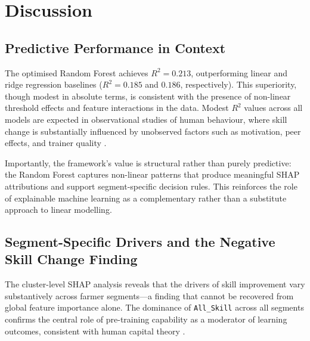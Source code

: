 \documentclass[3p,twocolumn,authoryear]{elsarticle}
\begin{document}
\section{Discussion}

\subsection{Predictive Performance in Context}

The optimised Random Forest achieves $R^{2} = 0.213$,
outperforming linear and ridge regression baselines
($R^{2} = 0.185$ and $0.186$, respectively).
This superiority, though modest in absolute terms, is
consistent with the presence of non-linear threshold
effects and feature interactions in the data.
Modest $R^{2}$ values across all models are expected
in observational studies of human behaviour, where skill
change is substantially influenced by unobserved factors
such as motivation, peer effects, and trainer quality
\citep{davis2012}.

Importantly, the framework's value is structural rather than
purely predictive: the Random Forest captures non-linear
patterns that produce meaningful SHAP attributions and
support segment-specific decision rules.
This reinforces the role of explainable machine learning
as a complementary rather than a substitute approach to
linear modelling.

\subsection{Segment-Specific Drivers and the Negative
            Skill Change Finding}

The cluster-level SHAP analysis reveals that the drivers
of skill improvement vary substantively across farmer
segments---a finding that cannot be recovered from global
feature importance alone.
The dominance of \texttt{All\_Skill} across all segments
confirms the central role of pre-training capability as a
moderator of learning outcomes, consistent with human
capital theory \citep{feder1985,davis2012}.
\end{document}
